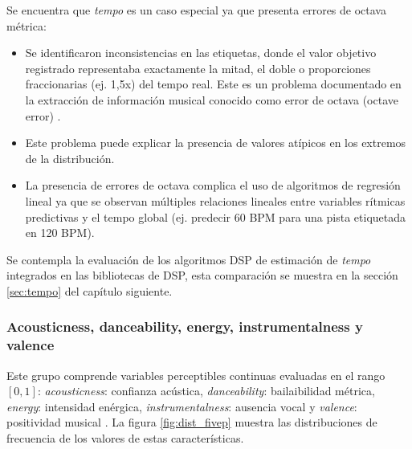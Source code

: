 Se encuentra que \textit{tempo} es un caso especial ya que presenta errores de octava métrica:

\begin{itemize}
    \item Se identificaron inconsistencias en las etiquetas, donde el valor objetivo registrado representaba exactamente la mitad, el doble o proporciones fraccionarias (ej. 1{,}5x) del tempo real. Este es un problema documentado en la extracción de información musical conocido como error de octava (octave error) \cite{muller2015fundamentals}.
    \item Este problema puede explicar la presencia de valores atípicos en los extremos de la distribución.
    \item La presencia de errores de octava complica el uso de algoritmos de regresión lineal ya que se observan múltiples relaciones lineales entre variables rítmicas predictivas y el tempo global (ej. predecir 60 BPM para una pista etiquetada en 120 BPM).%
\end{itemize}

Se contempla la evaluación de los algoritmos DSP de estimación de \textit{tempo} integrados en las bibliotecas de DSP, esta comparación se muestra en la sección \ref{sec:tempo} del capítulo siguiente. 

\subsubsection{Acousticness, danceability, energy, instrumentalness y valence}
Este grupo comprende variables perceptibles continuas evaluadas en el rango $[0, 1]$: \textit{acousticness}: confianza acústica, \textit{danceability}: bailaibilidad métrica, \textit{energy}: intensidad enérgica, \textit{instrumentalness}: ausencia vocal y \textit{valence}: positividad musical \citep{spotify}.
La figura \ref{fig:dist_fivep} muestra las distribuciones de frecuencia de los valores de estas características.

